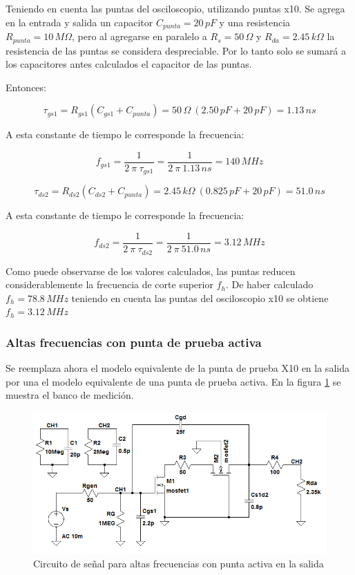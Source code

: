 \documentclass[10pt,spanish,a4paper,notitlepage]{article}
\begin{document}
Teniendo en cuenta las puntas del osciloscopio, utilizando puntas x10. Se
agrega en la entrada y salida un capacitor $C_{punta} = 20\,\unit{pF}$
y una resistencia $R_{punta} = 10\,\unit{M\Omega}$, pero al agregarse
en paralelo a $R_s = 50\,\unit{\Omega}$ y $R_{da} = 2.45\,\unit{k\Omega}$
la resistencia de las puntas se considera despreciable. Por lo tanto solo
se sumará a los capacitores antes calculados el capacitor de las puntas.

Entonces:

\[ \displaystyle \tau_{gs1} = R_{gs1} (C_{gs1} + C_{punta}) = 
50\,\unit{\Omega}\ (2.50\,\unit{pF} + 20\,\unit{pF}) =
1.13\,\unit{ns}\]

A esta constante de tiempo le corresponde la frecuencia:

\[ \displaystyle f_{gs1} = \frac{1}{2\ \pi \ \tau_{gs1}} =
\frac{1}{2\ \pi \ 1.13 \,\unit{ns}} = 140\,\unit{MHz} \]

\[ \displaystyle \tau_{ds2} = R_{ds2} (C_{ds2} + C_{punta}) = 
2.45\,\unit{k\Omega}\ (0.825\,\unit{pF} + 20\,\unit{pF}) =
51.0\,\unit{ns}\]

A esta constante de tiempo le corresponde la frecuencia:

\[ \displaystyle f_{ds2} = \frac{1}{2\ \pi \ \tau_{ds2}} =
\frac{1}{2\ \pi \ 51.0 \,\unit{ns}} = 3.12\,\unit{MHz} \]

Como puede observarse de los valores calculados, las puntas
reducen considerablemente la frecuencia de corte superior $f_h$.
De haber calculado $f_h = 78.8\,\unit{MHz}$ teniendo en cuenta
las puntas del osciloscopio x10 se obtiene $f_h = 3.12\,\unit{MHz}$


\subsubsection{Altas frecuencias con punta de prueba activa}

Se reemplaza ahora el modelo equivalente de la punta de prueba X10 en la salida por una
el modelo equivalente de una punta de prueba activa. 
En la figura \ref{fig:altas_frec_punta_activa} se muestra el banco
de medición.


\begin{figure}[H]
\centering
\includegraphics[scale=0.65]{circuitos/circuito_altas_frecuencias_punta_activa.png}
\caption{Circuito de señal para altas frecuencias con punta activa en la salida}
\label{fig:altas_frec_punta_activa}
\end{figure}
\end{document}
